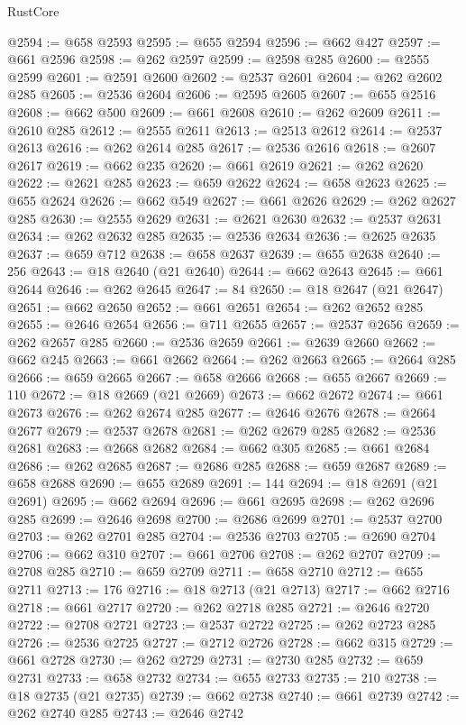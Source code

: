 \begin{lexlean}{RustCore}
\begin{coremodule}
@2594 := @658 @2593
@2595 := @655 @2594
@2596 := @662 @427
@2597 := @661 @2596
@2598 := @262 @2597
@2599 := @2598 @285
@2600 := @2555 @2599
@2601 := @2591 @2600
@2602 := @2537 @2601
@2604 := @262 @2602 @285
@2605 := @2536 @2604
@2606 := @2595 @2605
@2607 := @655 @2516
@2608 := @662 @500
@2609 := @661 @2608
@2610 := @262 @2609
@2611 := @2610 @285
@2612 := @2555 @2611
@2613 := @2513 @2612
@2614 := @2537 @2613
@2616 := @262 @2614 @285
@2617 := @2536 @2616
@2618 := @2607 @2617
@2619 := @662 @235
@2620 := @661 @2619
@2621 := @262 @2620
@2622 := @2621 @285
@2623 := @659 @2622
@2624 := @658 @2623
@2625 := @655 @2624
@2626 := @662 @549
@2627 := @661 @2626
@2629 := @262 @2627 @285
@2630 := @2555 @2629
@2631 := @2621 @2630
@2632 := @2537 @2631
@2634 := @262 @2632 @285
@2635 := @2536 @2634
@2636 := @2625 @2635
@2637 := @659 @712
@2638 := @658 @2637
@2639 := @655 @2638
@2640 := 256
@2643 := @18 @2640 (@21 @2640)
@2644 := @662 @2643
@2645 := @661 @2644
@2646 := @262 @2645
@2647 := 84
@2650 := @18 @2647 (@21 @2647)
@2651 := @662 @2650
@2652 := @661 @2651
@2654 := @262 @2652 @285
@2655 := @2646 @2654
@2656 := @711 @2655
@2657 := @2537 @2656
@2659 := @262 @2657 @285
@2660 := @2536 @2659
@2661 := @2639 @2660
@2662 := @662 @245
@2663 := @661 @2662
@2664 := @262 @2663
@2665 := @2664 @285
@2666 := @659 @2665
@2667 := @658 @2666
@2668 := @655 @2667
@2669 := 110
@2672 := @18 @2669 (@21 @2669)
@2673 := @662 @2672
@2674 := @661 @2673
@2676 := @262 @2674 @285
@2677 := @2646 @2676
@2678 := @2664 @2677
@2679 := @2537 @2678
@2681 := @262 @2679 @285
@2682 := @2536 @2681
@2683 := @2668 @2682
@2684 := @662 @305
@2685 := @661 @2684
@2686 := @262 @2685
@2687 := @2686 @285
@2688 := @659 @2687
@2689 := @658 @2688
@2690 := @655 @2689
@2691 := 144
@2694 := @18 @2691 (@21 @2691)
@2695 := @662 @2694
@2696 := @661 @2695
@2698 := @262 @2696 @285
@2699 := @2646 @2698
@2700 := @2686 @2699
@2701 := @2537 @2700
@2703 := @262 @2701 @285
@2704 := @2536 @2703
@2705 := @2690 @2704
@2706 := @662 @310
@2707 := @661 @2706
@2708 := @262 @2707
@2709 := @2708 @285
@2710 := @659 @2709
@2711 := @658 @2710
@2712 := @655 @2711
@2713 := 176
@2716 := @18 @2713 (@21 @2713)
@2717 := @662 @2716
@2718 := @661 @2717
@2720 := @262 @2718 @285
@2721 := @2646 @2720
@2722 := @2708 @2721
@2723 := @2537 @2722
@2725 := @262 @2723 @285
@2726 := @2536 @2725
@2727 := @2712 @2726
@2728 := @662 @315
@2729 := @661 @2728
@2730 := @262 @2729
@2731 := @2730 @285
@2732 := @659 @2731
@2733 := @658 @2732
@2734 := @655 @2733
@2735 := 210
@2738 := @18 @2735 (@21 @2735)
@2739 := @662 @2738
@2740 := @661 @2739
@2742 := @262 @2740 @285
@2743 := @2646 @2742

\end{coremodule}
\end{lexlean}

